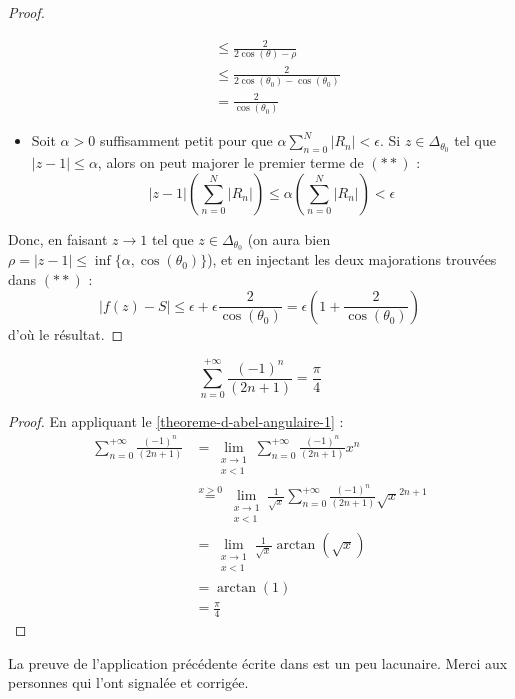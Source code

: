 \begin{proof}
\begin{itemize}
\begin{align*}
        &\leq \frac{2}{2\cos(\theta) - \rho} \\
        &\leq \frac{2}{2\cos(\theta_0) - \cos(\theta_0)} \\
        &= \frac{2}{\cos(\theta_0)}
      \end{align*}
      \item Soit $\alpha > 0$ suffisamment petit pour que $\alpha \sum_{n=0}^N |R_n| < \epsilon$. Si $z \in \Delta_{\theta_0}$ tel que $|z-1| \leq \alpha$, alors on peut majorer le premier terme de $(**)$ :
      \[ |z-1| \left( \sum_{n=0}^N |R_n| \right) \leq \alpha \left( \sum_{n=0}^N |R_n| \right) < \epsilon \]
    \end{itemize}
    Donc, en faisant $z \longrightarrow 1$ tel que $z \in \Delta_{\theta_0}$ (on aura bien $\rho = |z-1| \leq \inf \{ \alpha, \cos(\theta_0) \}$), et en injectant les deux majorations trouvées dans $(**)$ :
    \[ |f(z)-S| \leq \epsilon + \epsilon \frac{2}{\cos(\theta_0)} = \epsilon \left(1 + \frac{2}{\cos(\theta_0)} \right) \]
    d'où le résultat.
  \end{proof}

  \begin{application}
    \[ \sum_{n=0}^{+\infty} \frac{(-1)^n}{(2n+1)} = \frac{\pi}{4} \]
  \end{application}

  \begin{proof}
    En appliquant le \cref{theoreme-d-abel-angulaire-1} :
    \begin{align*}
      \sum_{n=0}^{+\infty} \frac{(-1)^n}{(2n+1)} &= \lim_{\substack{x \rightarrow 1 \\ x < 1}} \sum_{n=0}^{+\infty} \frac{(-1)^n}{(2n+1)} x^n \\
      &\overset{x > 0}{=} \lim_{\substack{x \rightarrow 1 \\ x < 1}} \frac{1}{\sqrt{x}} \sum_{n=0}^{+\infty} \frac{(-1)^n}{(2n+1)} \sqrt{x}^{2n+1} \\
      &= \lim_{\substack{x \rightarrow 1 \\ x < 1}} \frac{1}{\sqrt{x}} \arctan(\sqrt{x}) \\
      &= \arctan(1) \\
      &= \frac{\pi}{4}
    \end{align*}
  \end{proof}
  
  \begin{remark}
    La preuve de l'application précédente écrite dans \cite{[GOU20]} est un peu lacunaire. Merci aux personnes qui l'ont signalée et corrigée.
  \end{remark}

